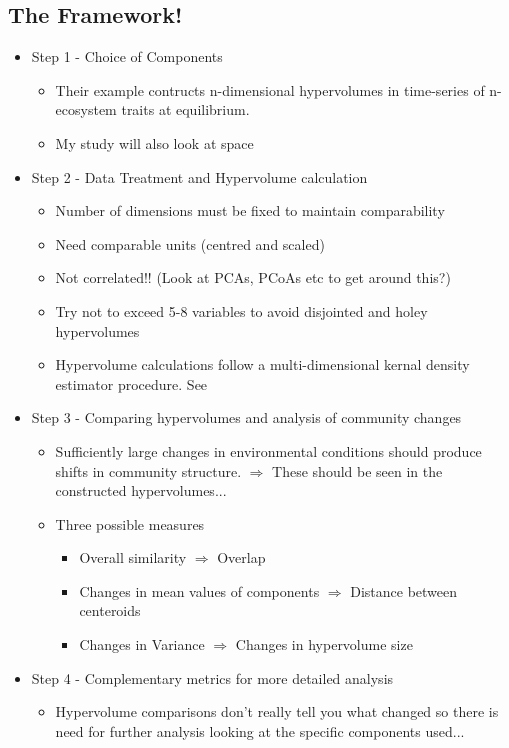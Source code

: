 \subsection*{The Framework!}
\begin{itemize}
	\item Step 1 - Choice of Components
	\begin{itemize}
		\item Their example contructs n-dimensional hypervolumes in time-series of n-ecosystem traits at equilibrium.
		\item My study will also look at space
	\end{itemize}
	
	\item Step 2 - Data Treatment and Hypervolume calculation
	\begin{itemize}
		\item Number of dimensions must be fixed to maintain comparability
		\item Need comparable units (centred and scaled)
		\item Not correlated!! (Look at PCAs, PCoAs etc to get around this?)
		\item Try not to exceed 5-8 variables to avoid disjointed and holey hypervolumes
		\item Hypervolume calculations follow a multi-dimensional kernal density estimator procedure. See \cite{Blonder2014}   
	\end{itemize}
	
	\item Step 3 - Comparing hypervolumes and analysis of community changes
	\begin{itemize}
		\item Sufficiently large changes in environmental conditions should produce shifts in community structure. $\Rightarrow$ These should be seen in the constructed hypervolumes...
		\item Three possible measures
		\begin{itemize}
			\item Overall similarity $\Rightarrow$ Overlap
			\item Changes in mean values of components $\Rightarrow$ Distance between centeroids
			\item Changes in Variance $\Rightarrow$ Changes in hypervolume size 
		\end{itemize}
	\end{itemize}
	
	\item Step 4 - Complementary metrics for more detailed analysis
	\begin{itemize}
		\item Hypervolume comparisons don't really tell you what changed so there is  need for further analysis looking at the specific components used...
	\end{itemize}
\end{itemize}

